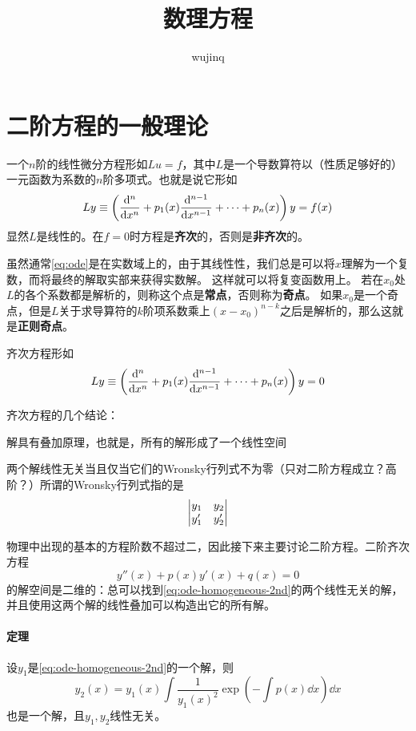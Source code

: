 \documentclass[UTF8]{ctexart}
\title{数理方程}
\author{wujinq}
\renewenvironment{itemize}{\begin{compactitem}}{\end{compactitem}}
\begin{document}
\maketitle

\section{二阶方程的一般理论}

一个$n$阶的线性微分方程形如$Lu=f$，其中$L$是一个导数算符以（性质足够好的）一元函数为系数的$n$阶多项式。也就是说它形如
\begin{equation}
    L y \equiv \left(\dv[n]{x} + p_1(x) \dv[n-1]{x} + \cdots + p_n(x) \right) y = f(x)
    \label{eq:ode}
\end{equation}
显然$L$是线性的。在$f=0$时方程是\textbf{齐次}的，否则是\textbf{非齐次}的。

虽然通常\eqref{eq:ode}是在实数域上的，由于其线性性，我们总是可以将$x$理解为一个复数，而将最终的解取实部来获得实数解。
这样就可以将复变函数用上。
若在$x_0$处$L$的各个系数都是解析的，则称这个点是\textbf{常点}，否则称为\textbf{奇点}。
如果$x_0$是一个奇点，但是$L$关于求导算符的$k$阶项系数乘上$(x-x_0)^{n-k}$之后是解析的，那么这就是\textbf{正则奇点}。

齐次方程形如
\begin{equation}
    L y \equiv \left(\dv[n]{x} + p_1(x) \dv[n-1]{x} + \cdots + p_n(x) \right) y = 0
    \label{eq:ode-homogeneous}
\end{equation}

齐次方程的几个结论：
\begin{itemize}
    \item 解具有叠加原理，也就是，所有的解形成了一个线性空间
    \item 两个解线性无关当且仅当它们的Wronsky行列式不为零（只对二阶方程成立？高阶？）所谓的Wronsky行列式指的是
    \[
        \mqty | y_1 & y_2 \\ y_1' & y_2' |
    \]
\end{itemize}

物理中出现的基本的方程阶数不超过二，因此接下来主要讨论二阶方程。二阶齐次方程
\begin{equation}
    y''(x) + p(x) y'(x) + q(x) = 0
    \label{eq:ode-homogeneous-2nd}
\end{equation}
的解空间是二维的：总可以找到\eqref{eq:ode-homogeneous-2nd}的两个线性无关的解，
并且使用这两个解的线性叠加可以构造出它的所有解。

\paragraph{定理} 设$y_1$是\eqref{eq:ode-homogeneous-2nd}的一个解，则
\begin{equation}
    y_2(x) = y_1(x) \int \frac{1}{y_1(x)^2} \exp \left(- \int p(x) \dd x\right) \dd x
    \label{eq:another-solution}
\end{equation}
也是一个解，且$y_1, y_2$线性无关。
\end{document}
